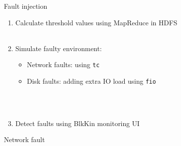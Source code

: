 \begin{frame}{Fault injection}
\begin{enumerate}
\item Calculate threshold values using MapReduce in HDFS
\hfill \\
\hfill \\
\item Simulate faulty environment:
    \begin{itemize}
    \item Network faults: using \texttt{tc}
    \item Disk faults: adding extra IO load using \texttt{fio}
    \end{itemize}
\hfill \\
\hfill \\
\item Detect faults using BlkKin monitoring UI
\end{enumerate}
\end{frame}

\begin{frame}{Network fault}
\begin{center}
\end{center}
\end{frame}


